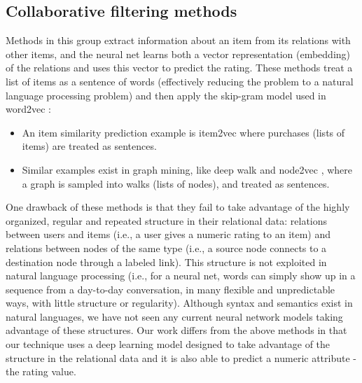 \documentclass[12pt]{WSUThesis}
\theoremstyle{definition}
\begin{document}
\subsection{Collaborative filtering methods}
Methods in this group extract information about an item from its relations 
with other items,
and the neural net learns both a vector representation (embedding) of the relations and uses this vector to predict the rating.
These methods treat a list of items as a sentence of words 
(effectively reducing the problem to a natural language processing problem)  
and then apply the skip-gram model used in word2vec \cite{mikolov2013linguistic}:
\begin{itemize}
	\item An item similarity prediction example is item2vec 
	\cite{barkan2016item2vec} where purchases (lists of items) are 
	treated as sentences.
	\item Similar examples exist in graph mining, like deep walk 
	\cite{perozzi2014deepwalk} and node2vec \cite{grover2016node2vec}, 
	where a graph is sampled into walks (lists of nodes),
	and treated as sentences.
\end{itemize}
One drawback of these methods is that they fail to take advantage of 
the highly organized, regular and repeated structure in their relational data: 
relations between users and items (i.e., a user gives a numeric rating to an 
item) and relations between nodes of the same type (i.e., a source node connects to a 
destination node through a labeled link).
This structure is not exploited in natural language processing (i.e., for a neural net, words can simply show up in a sequence 
from a day-to-day conversation, in many flexible and unpredictable ways, with 
little structure or regularity).
Although syntax and semantics exist in natural languages, we have not seen any 
current neural network models taking advantage of these structures.
Our work differs from the above methods in that our technique uses a 
deep learning model designed to take advantage of the structure in the 
relational data and it is also able to predict a numeric attribute - the rating 
value.
\end{document}
